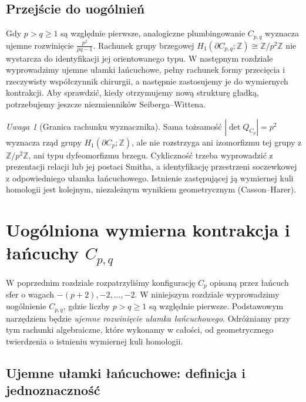 \documentclass[11pt,a4paper]{report}
\numberwithin{equation}{section}
\theoremstyle{plain}
\theoremstyle{definition}
\theoremstyle{remark}
\newtheorem{uwaga}[twierdzenie]{Uwaga}
\begin{document}
\section{Przejście do uogólnień}
\label{sec:tg-rb-general}
Gdy $p>q\geq1$ są względnie pierwsze, analogiczne
plumbingowanie $C_{p,q}$ wyznacza ujemne rozwinięcie
$\frac{p^2}{pq-1}$. Rachunek grupy brzegowej
$H_1(\partial C_{p,q};\mathbb Z)\cong\mathbb Z/p^2\mathbb Z$
nie wystarcza do identyfikacji jej orientowanego typu.
W następnym rozdziale wyprowadzimy ujemne ułamki łańcuchowe,
pełny rachunek formy przecięcia i rzeczywisty współczynnik
chirurgii, a następnie zastosujemy je do wymiernych kontrakcji.
Aby sprawdzić, kiedy otrzymujemy nową strukturę gładką,
potrzebujemy jeszcze niezmienników Seiberga--Wittena.

\begin{uwaga}[Granica rachunku wyznacznika]
Sama tożsamość $|\det Q_{C_p}|=p^2$ wyznacza rząd
grupy $H_1(\partial C_p;\mathbb Z)$, ale nie rozstrzyga
ani izomorfizmu tej grupy z $\mathbb Z/p^2\mathbb Z$,
ani typu dyfeomorfizmu brzegu. Cykliczność trzeba
wyprowadzić z prezentacji relacji lub jej postaci Smitha,
a identyfikację przestrzeni soczewkowej z odpowiedniego
ułamka łańcuchowego. Istnienie zastępującej ją wymiernej
kuli homologii jest kolejnym, niezależnym wynikiem
geometrycznym (Casson--Harer).
\end{uwaga}

\chapter{Uogólniona wymierna kontrakcja i łańcuchy \texorpdfstring{$C_{p,q}$}{Cpq}}
\label{ch:tg-rb-general}

W poprzednim rozdziale rozpatrzyliśmy konfigurację $C_p$ opisaną przez
łańcuch sfer o wagach $-(p+2),-2,\ldots,-2$. W niniejszym
rozdziale wyprowadzimy uogólnienie $C_{p,q}$, gdzie liczby $p>q\geq1$
są względnie pierwsze. Podstawowym narzędziem będzie \emph{ujemne
rozwinięcie ułamka łańcuchowego}. Odróżniamy przy tym rachunki
algebraiczne, które wykonamy w całości, od geometrycznego twierdzenia
o istnieniu wymiernej kuli homologii.

\section{Ujemne ułamki łańcuchowe: definicja i jednoznaczność}
\label{sec:tg-general-cf}
\end{document}
